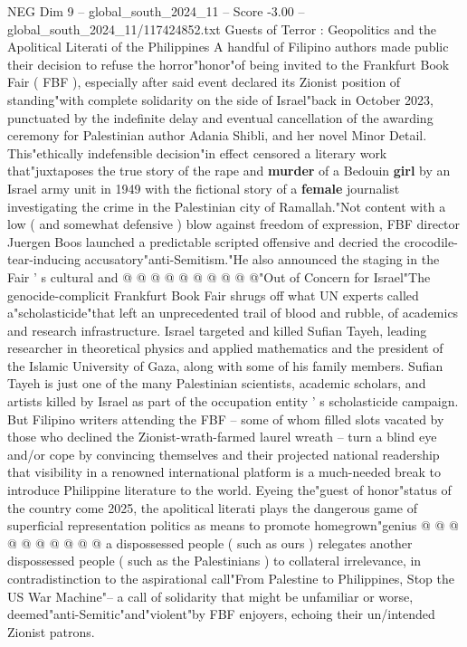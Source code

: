 \begin{textsample}{NEG Dim 9 – global\_south\_2024\_11 – Score -3.00 – global\_south\_2024\_11/117424852.txt}  \label{ex:f9_neg_419}
Guests of Terror : Geopolitics and the Apolitical Literati of the Philippines A handful of Filipino authors made public their decision to refuse the horror"honor"of being invited to the Frankfurt Book Fair ( FBF ), especially after said event declared its Zionist position of standing"with complete solidarity on the side of Israel"back in October 2023, punctuated by the indefinite delay and eventual cancellation of the awarding ceremony for Palestinian author Adania Shibli, and her novel Minor Detail.
This"ethically indefensible decision"in effect censored a literary work that"juxtaposes the true story of the rape and \textbf{murder} of a Bedouin \textbf{girl} by an Israel army unit in 1949 with the fictional story of a \textbf{female} journalist investigating the crime in the Palestinian city of Ramallah."Not content with a low ( and somewhat defensive ) blow against freedom of expression, FBF director Juergen Boos launched a predictable scripted offensive and decried the crocodile-tear-inducing accusatory"anti-Semitism."He also announced the staging in the Fair ' s cultural and @ @ @ @ @ @ @ @ @ @"Out of Concern for Israel"The genocide-complicit Frankfurt Book Fair shrugs off what UN experts called a"scholasticide"that left an unprecedented trail of blood and rubble, of academics and research infrastructure.
Israel targeted and killed Sufian Tayeh, leading researcher in theoretical physics and applied mathematics and the president of the Islamic University of Gaza, along with some of his family members.
Sufian Tayeh is just one of the many Palestinian scientists, academic scholars, and artists killed by Israel as part of the occupation entity ' s scholasticide campaign.
But Filipino writers attending the FBF -- some of whom filled slots vacated by those who declined the Zionist-wrath-farmed laurel wreath -- turn a blind eye and/or cope by convincing themselves and their projected national readership that visibility in a renowned international platform is a much-needed break to introduce Philippine literature to the world.
Eyeing the"guest of honor"status of the country come 2025, the apolitical literati plays the dangerous game of superficial representation politics as means to promote homegrown"genius @ @ @ @ @ @ @ @ @ @ a dispossessed people ( such as ours ) relegates another dispossessed people ( such as the Palestinians ) to collateral irrelevance, in contradistinction to the aspirational call"From Palestine to Philippines, Stop the US War Machine"-- a call of solidarity that might be unfamiliar or worse, deemed"anti-Semitic"and"violent"by FBF enjoyers, echoing their un/intended Zionist patrons.

\end{textsample}
